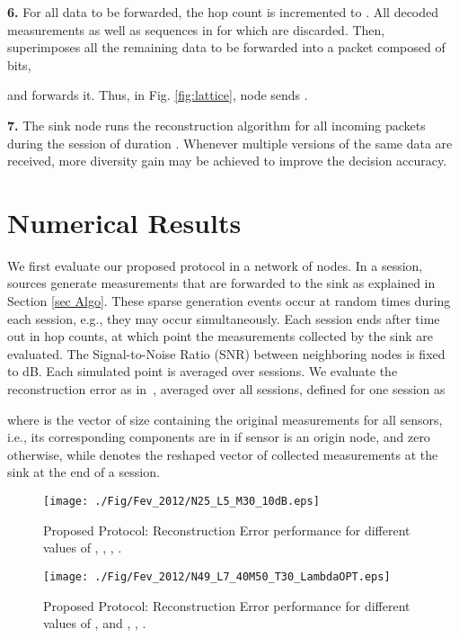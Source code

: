 \documentclass[letterpaper,conference]{IEEEtran}
\begin{document}
\noindent \textbf{6.} For all data  to be forwarded, the hop count is incremented to .
All decoded measurements as well as sequences in  for which  are discarded.
Then,  superimposes all the remaining data to be forwarded into a packet  composed of  bits,

and forwards it. Thus, in Fig. \ref{fig:lattice}, node  sends .

\noindent \textbf{7.} The sink node runs the reconstruction algorithm for all incoming packets during the session of duration . Whenever multiple versions of the same data are received, more diversity gain may be achieved to improve the decision accuracy.



\section{Numerical Results}

We first evaluate our proposed protocol in a network of  nodes. In a session,  sources generate measurements that are forwarded to the sink as explained in Section \ref{sec Algo}. These sparse generation events occur at random times during each session, e.g., they may occur simultaneously. Each session ends after time out  in hop counts, at which point the measurements collected by the sink are evaluated. The Signal-to-Noise Ratio (SNR) between neighboring nodes is fixed to  dB. Each simulated point is averaged over  sessions.
We evaluate the reconstruction error as in~\cite{Que09feb}\cite{Wan10oct}, averaged over all sessions, defined for one session as

where  is the vector of size  containing the original measurements for all  sensors, i.e., its corresponding components are in  if sensor  is an origin node, and zero otherwise, while  denotes the reshaped vector of collected measurements at the sink at the end of a session.

\begin{figure}[h]
\begin{center}
   \texttt{[image: ./Fig/Fev\_2012/N25\_L5\_M30\_10dB.eps]} \vspace{-0.6cm}
\caption{Proposed Protocol: Reconstruction Error performance for different values of , , , .}
\label{fig:REN25}
\end{center}
\end{figure}


\begin{figure}[h]
\begin{center}
   \texttt{[image: ./Fig/Fev\_2012/N49\_L7\_40M50\_T30\_LambdaOPT.eps]} \vspace{-0.6cm}
\caption{Proposed Protocol: Reconstruction Error performance for different values of ,  and , , .}
\label{fig:REN49}
\end{center}
\end{figure}
\end{document}
